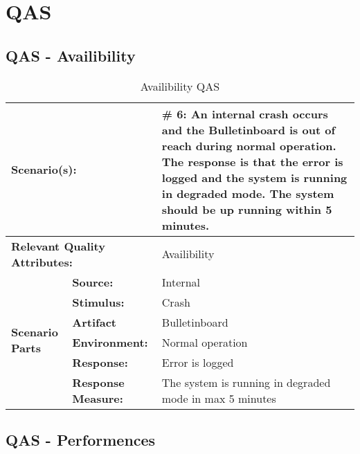\chapter{QAS}
\section{QAS - Availibility}
\label{sec:the_remaining_qas:Availibility}

\begin{table}[H]
\begin{center}
\begin{tabular}{|p{0.3cm}|p{2.5cm}|p{8cm}|}
  \hline
  \multicolumn{2}{|p{3cm}|}{\bfseries Scenario(s):} & \#  6: An internal crash occurs and the Bulletinboard is out of reach during normal operation. The response is that the error is logged and the system is running in degraded mode. The system should be up running within 5 minutes.\\
  \hline
  \multicolumn{2}{|p{3cm}|}{\bfseries Relevant Quality Attributes:} & Availibility\\
  \hline
  \multirow{6}{*}{\begin{sideways}{\bfseries Scenario Parts}\end{sideways}}
  & {\bfseries Source:} & Internal  \\
  \cline{2-3}
  & {\bfseries Stimulus:} & Crash \\
  \cline{2-3}
  & {\bfseries Artifact} &  Bulletinboard \\
  \cline{2-3}
  & {\bfseries Environment:} &  Normal operation \\
  \cline{2-3}
  & {\bfseries Response:} &  Error is logged\\
  \cline{2-3}
  & {\bfseries Response Measure:} &  The system is running in degraded mode in max 5 minutes\\
  \hline
\end{tabular}
\caption{Availibility QAS}
\end{center}
\end{table}





\section{QAS - Performences}
\label{sec:the_remaining_qas:Performence}


